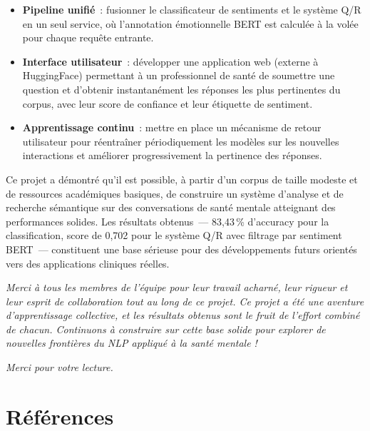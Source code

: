 \documentclass[12pt,a4paper]{report}
\begin{document}
\begin{itemize}
  \item \textbf{Pipeline unifié}~: fusionner le classificateur de sentiments et le système
    Q/R en un seul service, où l'annotation émotionnelle BERT est calculée à la volée pour
    chaque requête entrante.
  \item \textbf{Interface utilisateur}~: développer une application web (externe à HuggingFace)
    permettant à un professionnel de santé de soumettre une question et d'obtenir instantanément les
    réponses les plus pertinentes du corpus, avec leur score de confiance et leur étiquette
    de sentiment.
  \item \textbf{Apprentissage continu}~: mettre en place un mécanisme de retour utilisateur
    pour réentraîner périodiquement les modèles sur les nouvelles interactions et améliorer
    progressivement la pertinence des réponses.
\end{itemize}

\begin{note}
Ce projet a démontré qu'il est possible, à partir d'un corpus de taille modeste et de
ressources académiques basiques, de construire un système d'analyse et de recherche
sémantique sur des conversations de santé mentale atteignant des performances solides.
Les résultats obtenus~--- 83,43\,\% d'accuracy pour la classification, score de 0,702
pour le système Q/R avec filtrage par sentiment BERT~--- constituent une base sérieuse
pour des développements futurs orientés vers des applications cliniques réelles.
\end{note}

\vfill

\begin{center}
\textit{Merci à tous les membres de l'équipe pour leur travail acharné, leur rigueur et leur esprit de collaboration tout au long de ce projet.
Ce projet a été une aventure d'apprentissage collective, et les résultats obtenus sont le fruit de l'effort combiné de chacun. Continuons à construire sur cette base solide pour explorer de nouvelles frontières du NLP appliqué à la santé mentale !}

\textit{Merci pour votre lecture.}
\end{center}

\chapter*{Références}
\end{document}
